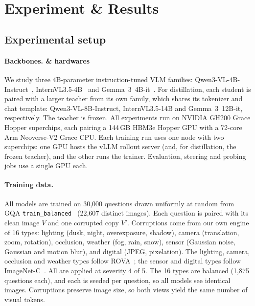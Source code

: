 \documentclass[10pt,twocolumn,letterpaper]{article}
\begin{document}
\section{Experiment \& Results}
\label{sec:results}

\subsection{Experimental setup}
\label{sec:setup}

\paragraph{Backbones. \& hardwares}
We study three 4B-parameter instruction-tuned VLM families: Qwen3-VL-4B-Instruct~\citep{bai2025qwen3vltechnicalreport},
InternVL3.5-4B~\citep{chen2024internvlscalingvisionfoundation} and Gemma~3~4B-it~\citep{gemmateam2025gemma3technicalreport}. For distillation, each
student is paired with a larger teacher from its own family, which shares its tokenizer and
chat template: Qwen3-VL-8B-Instruct, InternVL3.5-14B and Gemma~3~12B-it, respectively. The
teacher is frozen. All experiments run on NVIDIA GH200 Grace Hopper superchips, each pairing a 144\,GB HBM3e
Hopper GPU with a 72-core Arm Neoverse-V2 Grace CPU. Each training run uses one node with two
superchips: one GPU hosts the vLLM rollout server (and, for distillation, the frozen teacher),
and the other runs the trainer. 
Evaluation, steering and probing jobs use a single GPU each.
\paragraph{Training data.}
All models are trained on 30{,}000 questions drawn uniformly at random from GQA
\texttt{train\_balanced}~\citep{hudson2019gqa} (22{,}607 distinct images). Each question is
paired with its clean image $V$ and one corrupted copy $V'$.  Corruptions come from our own engine of 16 types:
lighting (dusk, night, overexposure, shadow),
camera (translation, zoom, rotation),
occlusion,
weather (fog, rain, snow),
sensor (Gaussian noise, Gaussian and motion blur), and
digital (JPEG, pixelation).
The lighting, camera, occlusion and weather types follow ROVA~\citep{he2026videoreasoningmodelsready}; the sensor
and digital types follow ImageNet-C~\citep{hendrycks2019benchmarkingneuralnetworkrobustness}. All are applied at
severity 4 of 5.  The 16 types are
balanced (1{,}875 questions each), and each is seeded per question, so all models see identical
images. Corruptions preserve image size, so both views yield the same number of visual tokens.
\end{document}
